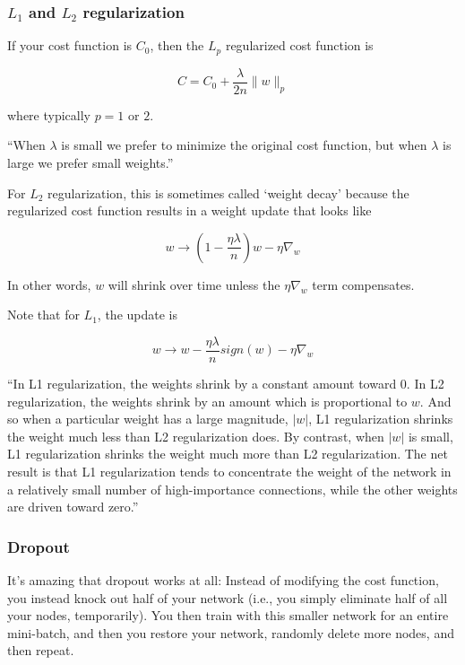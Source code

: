 \documentclass[12pt]{article}
\begin{document}
\subsubsection*{$L_1$ and $L_2$ regularization}

If your cost function is $C_0$, then the $L_p$ regularized cost function is

$$ C = C_0 + \frac{\lambda}{2n}\| w \|_p $$

where typically $p = 1$ or $2$.

``When $\lambda$ is small we prefer to minimize the original cost function, but when $\lambda$ is large we prefer small weights.''

For $L_2$ regularization, this is sometimes called `weight decay' because the regularized cost function results in a weight update that looks like

$$ w \to (1 - \frac{\eta\lambda}{n})w- \eta \nabla_w $$

In other words, $w$ will shrink over time unless the $\eta \nabla_w$ term compensates.

Note that for $L_1$, the update is

$$ w \to w - \frac{\eta\lambda}{n}sign(w)- \eta \nabla_w $$

``In L1 regularization, the weights shrink by a constant amount toward $0$. In L2 regularization, the weights shrink by an amount which is proportional to $w$. And so when a particular weight has a large magnitude, $|w|$, L1 regularization shrinks the weight much less than L2 regularization does. By contrast, when $|w|$ is small, L1 regularization shrinks the weight much more than L2 regularization. The net result is that L1 regularization tends to concentrate the weight of the network in a relatively small number of high-importance connections, while the other weights are driven toward zero.''

\subsubsection*{Dropout}

It's amazing that dropout works at all: Instead of modifying the cost function, you instead knock out half of your network (i.e., you simply eliminate half of all your nodes, temporarily). You then train with this smaller network for an entire mini-batch, and then you restore your network, randomly delete more nodes, and then repeat.
\end{document}
